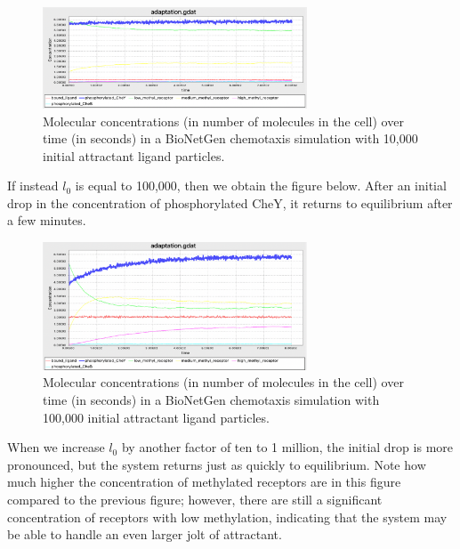 \begin{figure}[h]
\centering
\mySfFamily
\includegraphics[width = 0.7\textwidth]{../images/chemotaxis_tutorial_oneadd1e4.png}
\caption{Molecular concentrations (in number of molecules in the cell) over time (in seconds) in a BioNetGen chemotaxis simulation with 10,000 initial attractant ligand particles.}
\label{fig:chemotaxis_tutorial_oneadd1e4}
\end{figure}


If instead $l_0$ is equal to 100,000, then we obtain the figure below. After an initial drop in the concentration of phosphorylated CheY, it returns to equilibrium after a few minutes.

\begin{figure}[h]
\centering
\mySfFamily
\includegraphics[width = 0.7\textwidth]{../images/chemotaxis_tutorial_oneadd1e5.png}
\caption{Molecular concentrations (in number of molecules in the cell) over time (in seconds) in a BioNetGen chemotaxis simulation with 100,000 initial attractant ligand particles.}
\label{fig:chemotaxis_tutorial_oneadd1e5}
\end{figure}


When we increase $l_0$ by another factor of ten to 1 million, the initial drop is more pronounced, but the system returns just as quickly to equilibrium. Note how much higher the concentration of methylated receptors are in this figure compared to the previous figure; however, there are still a significant concentration of receptors with low methylation, indicating that the system may be able to handle an even larger jolt of attractant.

